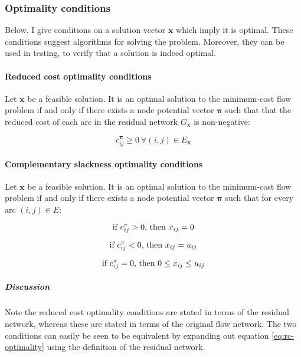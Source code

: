 \subsubsection{Optimality conditions}

Below, I give conditions on a solution vector $\mathbf{x}$ which
imply it is optimal. These conditions suggest algorithms for solving
the problem. Moreover, they can be used in testing, to verify that
a solution is indeed optimal.

\paragraph{Reduced cost optimality conditions}

Let $\mathbf{x}$ be a feasible solution. It is an optimal solution
to the minimum-cost flow problem if and only if there exists a node
potential vector $\boldsymbol{\pi}$ such that that the reduced cost
of each arc in the residual network $G_{\mathbf{x}}$ is non-negative:

\begin{equation} \label{eq:rc-optimality}
c_{ij}^{\boldsymbol{\pi}}\geq0\:\forall(i,j)\in E_{\mathbf{x}}
\end{equation}

\paragraph{Complementary slackness optimality conditions}

Let $\mathbf{x}$ be a feasible solution. It is an optimal solution
to the minimum-cost flow problem if and only if there exists a node
potential vector $\boldsymbol{\pi}$ such that for every arc $(i,j)\in E$:

\begin{equation}
\text{if \ensuremath{c_{ij}^{\pi}>0}, then \ensuremath{x_{ij}=0}}
\end{equation}

\begin{equation}
\text{if \ensuremath{c_{ij}^{\pi}<0}, then \ensuremath{x_{ij}=u_{ij}}}
\end{equation}

\begin{equation}
\text{if \ensuremath{c_{ij}^{\pi}=0}, then \ensuremath{0\leq x_{ij}\leq u_{ij}}}
\end{equation}

\subparagraph{Discussion}

Note the reduced cost optimality conditions are stated in terms of
the residual network, whereas these are stated in terms of the original
flow network. The two conditions can easily be seen to be equivalent
by expanding out equation \ref{eq:rc-optimality} using the definition of the
residual network.

